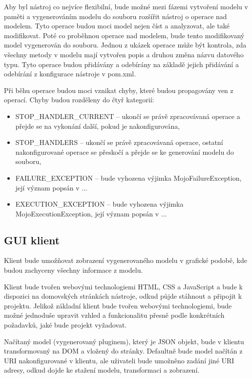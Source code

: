 \documentclass[11pt,twoside,a4paper]{book}
\begin{document}
Aby byl nástroj co nejvíce flexibilní, bude možné mezi fázemi vytvoření modelu v paměti a
vygenerováním modelu do souboru rozšířit nástroj o operace nad modelem. Tyto operace
budou moci model nejen číst a analyzovat, ale také modifikovat. Poté co proběhnou operace
nad modelem, bude tento modifikovaný model vygenerován do souboru. Jednou z ukázek
operace může být kontrola, zda všechny metody v modelu mají vytvořen popis a druhou
změna názvu datového typu. Tyto operace budou přidávány a odebírány na základě jejich
přidávání a odebírání z konfigurace nástroje v pom.xml.

Při běhu operace budou moci vznikat chyby, které budou propagovány ven z operací. Chyby
budou rozděleny do čtyř kategorií:

\begin{itemize}
  \item STOP\_HANDLER\_CURRENT – ukončí se právě zpracovávaná operace a přejde
  se na vykonání další, pokud je nakonfigurována,
  \item STOP\_HANDLERS – ukončí se právě zpracovávaná operace, ostatní 
  nakonfigurované operace se přeskočí a přejde se ke generování modelu do souboru,
  \item FAILURE\_EXCEPTION – bude vyhozena výjimka MojoFailureException, její
význam popsán v ...
  \item EXECUTION\_EXCEPTION – bude vyhozena výjimka MojoExecutionException,
  její význam popsán v ...
\end{itemize}

\subsection{GUI klient}

Klient bude umožňovat zobrazení vygenerovaného modelu v grafické podobě, kde budou
zachyceny všechny informace z modelu.

Klient bude tvořen webovými technologiemi HTML, CSS a JavaScript a bude k dispozici na
domovských stránkách nástroje, odkud půjde stáhnout a připojit k projektu. Jelikož základní
klient bude tvořen webovými technologiemi, bude možné jednoduše upravit vzhled a
funkcionalitu přesně podle konkrétních požadavků, jaké bude projekt vyžadovat.

Načítaný model (vygenerovaný pluginem), který je JSON objekt, bude v klientu
transformovaný na DOM a vložený do stránky. Defaultně bude model načítán z URI
nakonfigurované v klientu, ale uživateli bude umožněno zadání jiné URI adresy, odkud dojde
ke stažení modelu, transformaci a zobrazení.
\end{document}
